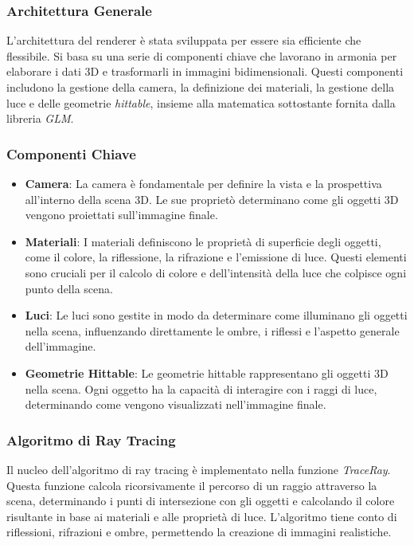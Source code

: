 \documentclass[12pt]{article}
\begin{document}
\subsubsection{Architettura Generale}
L'architettura del renderer è stata sviluppata per essere sia efficiente che flessibile. Si basa su una serie di componenti chiave che lavorano in armonia per elaborare i dati 3D e trasformarli in immagini bidimensionali.
Questi componenti includono la gestione della camera, la definizione dei materiali, la gestione della luce e delle geometrie \textit{hittable}, insieme alla matematica sottostante fornita dalla libreria \textit{GLM}.

\subsubsection{Componenti Chiave}
\begin{itemize}
\item \textbf{Camera}: La camera è fondamentale per definire la vista e la prospettiva all'interno della scena 3D. Le sue proprietò determinano come gli oggetti 3D vengono proiettati sull'immagine finale.

\item \textbf{Materiali}: I materiali definiscono le proprietà di superficie degli oggetti, come il colore, la riflessione, la rifrazione e l'emissione di luce. Questi elementi sono cruciali per il calcolo di colore e dell'intensità della luce che colpisce ogni punto della scena.

\item \textbf{Luci}: Le luci sono gestite in modo da determinare come illuminano gli oggetti nella scena, influenzando direttamente le ombre, i riflessi e l'aspetto generale dell'immagine.

\item \textbf{Geometrie Hittable}: Le geometrie hittable rappresentano gli oggetti 3D nella scena. Ogni oggetto ha la capacità di interagire con i raggi di luce, determinando come vengono visualizzati nell'immagine finale.
\end{itemize}

\subsubsection{Algoritmo di Ray Tracing}
Il nucleo dell'algoritmo di ray tracing è implementato nella funzione \textit{TraceRay}. Questa funzione calcola ricorsivamente il percorso di un raggio attraverso la scena, determinando i punti di intersezione con gli oggetti e calcolando il colore risultante in base ai materiali e alle proprietà di luce. L'algoritmo tiene conto di riflessioni, rifrazioni e ombre, permettendo la creazione di immagini realistiche.
\end{document}
